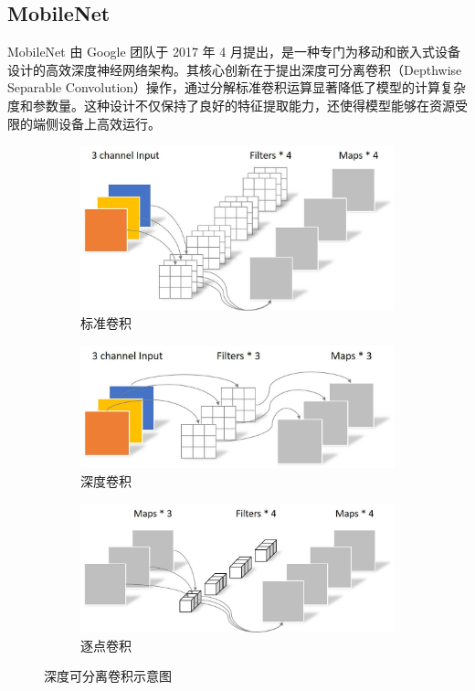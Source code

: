 \documentclass{article}
\begin{document}
\subsection{MobileNet}
MobileNet\cite{howard2017mobilenets} 由 Google 团队于 2017 年 4 月提出，是一种专门为移动和嵌入式设备设计的高效深度神经网络架构。其核心创新在于提出深度可分离卷积（Depthwise Separable Convolution）操作，通过分解标准卷积运算显著降低了模型的计算复杂度和参数量。这种设计不仅保持了良好的特征提取能力，还使得模型能够在资源受限的端侧设备上高效运行。

\begin{figure}[htbp]
    \centering
    \begin{subfigure}[b]{0.32\textwidth}
        \centering
        \includegraphics[width=\linewidth]{imgs/std_cov.jpg}
        \caption{标准卷积}
    \end{subfigure}
    \begin{subfigure}[b]{0.32\textwidth}
        \centering
        \includegraphics[width=\linewidth]{imgs/dpth_cov.jpg}
        \caption{深度卷积}
    \end{subfigure}
    \begin{subfigure}[b]{0.32\textwidth}
        \centering
        \includegraphics[width=\linewidth]{imgs/sep_cov.jpg}
        \caption{逐点卷积}
    \end{subfigure}
    \caption{深度可分离卷积示意图}
    \label{fig:mobilenet_conv}
\end{figure}
\end{document}
